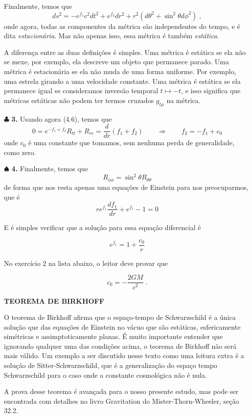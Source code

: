 \documentclass[11pt]{article}
\begin{document}
Finalmente, temos que
\[ \tag{4.6} ds^2 = - e^{f_1} c^2 dt^2 + e^{f_2}dr^2 + r^2 (d\theta^2 + \sin^2\theta d\phi^2)\; ,\]
onde agora, todas as componentes da métrica são independentes do tempo,
e é dita \emph{estacionária}. Mas não apenas isso, essa métrica é também
\emph{estática}.

A diferença entre as duas definições é simples. Uma métrica é estática
se ela não se mexe, por exemplo, ela descreve um objeto que permanece
parado. Uma métrica é estacionária se ela não muda de uma forma
uniforme. Por exemplo, uma estrela girando a uma velocidade constante.
Uma métrica é estática se ela permanece igual se consideramos inversão
temporal \(t\mapsto -t\), e isso significa que métricas estáticas não
podem ter termos cruzados \(g_{t\mu}\) na métrica.

    \(\clubsuit\) \textbf{3.} Usando agora (4.6), temos que
\[\tag{4.7} 0 = e^{-f_1 + f_2}R_{tt} + R_{rr} = \frac{d}{dr}(f_1 + f_2)\qquad \Rightarrow \qquad  f_2 = -f_1 + c_0 \]
onde \(c_0\) é uma constante que tomamos, sem nenhuma perda de
generalidade, como zero.

    \(\spadesuit\) \textbf{4.} Finalmente, temos que
\[ \tag{4.8} R_{\phi\phi} = \sin^2 \theta R_{\theta\theta}\] de forma
que nos resta apenas uma equações de Einstein para nos preocuparmos, que
é \[ \tag{4.9} r e^{f_1} \frac{d f_1}{dr}  + e^{f_1} - 1 = 0  \]

    E é simples verificar que a solução para essa equação diferencial é

\[ \tag{4.10} e^{f_1} = 1 + \frac{c_0}{r} \]

No exercício 2 na lista abaixo, o leitor deve provar que

\[ \tag{4.11} c_0 = - \frac{2 G M}{c^2}\; . \]

    \textbf{TEOREMA DE BIRKHOFF}

O teorema de Birkhoff afirma que o espaço-tempo de Schwarzschild é a
única solução que das equações de Einstein no vácuo que são estáticas,
esfericamente simétricas e assimptoticamente planas. É muito importante
entender que ignorando qualquer uma das condições acima, o teorema de
Birkhoff não será mais válido. Um exemplo a ser discutido nesse texto
como uma leitura extra é a solução de Sitter-Schwarzschild, que é a
generalização do espaço tempo Schwarzschild para o caso onde a constante
cosmológica não é nula.

A prova desse teorema é avançada para o nosso presente estudo, mas pode
ser encontrada com detalhes no livro Gravitation do
Mister-Thorn-Wheeler, seção 32.2.
\end{document}
